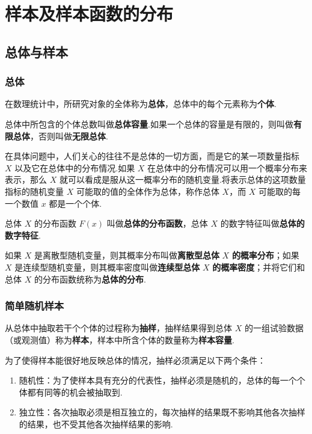 \chapter{样本及样本函数的分布}

\section{总体与样本}

\subsection{总体}

在数理统计中，所研究对象的全体称为\textbf{总体}，总体中的每个元素称为\textbf{个体}.

总体中所包含的个体总数叫做\textbf{总体容量}.如果一个总体的容量是有限的，则叫做\textbf{有限总体}，否则叫做\textbf{无限总体}.

在具体问题中，人们关心的往往不是总体的一切方面，而是它的某一项数量指标 $X$ 以及它在总体中的分布情况.如果 $X$ 在总体中的分布情况可以用一个概率分布来表示，那么 $X$ 就可以看成是服从这一概率分布的随机变量.将表示总体的这项数量指标的随机变量 $X$ 可能取的值的全体作为总体，称作总体 $X$，而 $X$ 可能取的每一个数值 $x$ 都是一个个体.

总体 $X$ 的分布函数 $F(x)$ 叫做\textbf{总体的分布函数}，总体 $X$ 的数字特征叫做\textbf{总体的数字特征}.

如果 $X$ 是离散型随机变量，则其概率分布叫做\textbf{离散型总体} $X$ \textbf{的概率分布}；如果 $X$ 是连续型随机变量，则其概率密度叫做\textbf{连续型总体} $X$ \textbf{的概率密度}；并将它们和总体 $X$ 的分布函数统称为\textbf{总体的分布}.

\subsection{简单随机样本}

从总体中抽取若干个个体的过程称为\textbf{抽样}，抽样结果得到总体 $X$ 的一组试验数据（或观测值）称为\textbf{样本}，样本中所含个体的数量称为\textbf{样本容量}.

为了使得样本能很好地反映总体的情况，抽样必须满足以下两个条件：
\begin{enumerate}
    \item 随机性：为了使样本具有充分的代表性，抽样必须是随机的，总体的每一个个体都有同等的机会被抽取到.
    \item 独立性：各次抽取必须是相互独立的，每次抽样的结果既不影响其他各次抽样的结果，也不受其他各次抽样结果的影响.
\end{enumerate}

